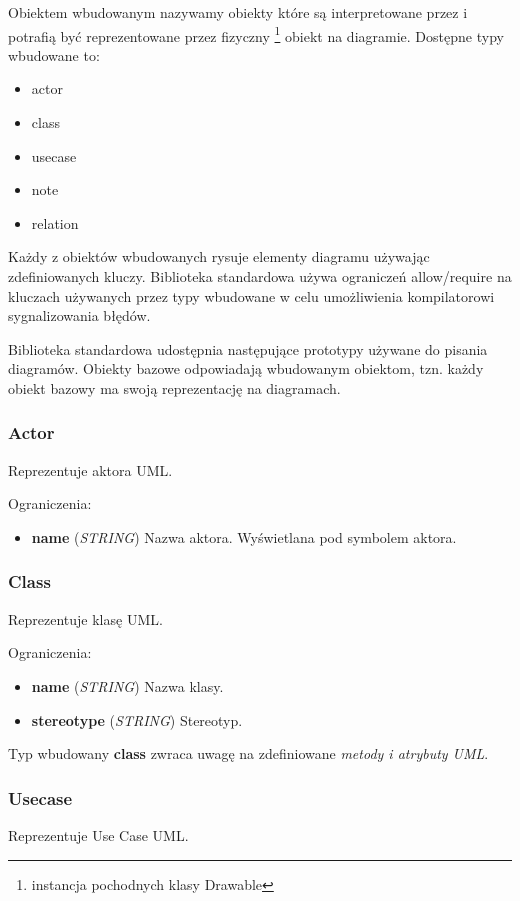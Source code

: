 Obiektem wbudowanym nazywamy obiekty które są interpretowane przez \omlet i potrafią być reprezentowane przez fizyczny \footnote{instancja pochodnych klasy Drawable} obiekt na diagramie. Dostępne typy wbudowane to:

\begin{itemize}
	\item actor
	\item class
	\item usecase
	\item note
	\item relation
\end{itemize}

Każdy z obiektów wbudowanych rysuje elementy diagramu używając zdefiniowanych kluczy. Biblioteka standardowa używa ograniczeń allow/require na kluczach używanych przez typy wbudowane w celu umożliwienia kompilatorowi sygnalizowania błędów.

Biblioteka standardowa udostępnia następujące prototypy używane do pisania diagramów. Obiekty bazowe odpowiadają wbudowanym obiektom, tzn. każdy obiekt bazowy ma swoją reprezentację na diagramach.

\subsubsection{Actor}
Reprezentuje aktora UML.

Ograniczenia:
\begin{itemize}
	\item \textbf{name} (\emph{STRING}) Nazwa aktora. Wyświetlana pod symbolem aktora.
\end{itemize}
	
\subsubsection{Class}
Reprezentuje klasę UML.

Ograniczenia:
\begin{itemize}
	\item \textbf{name} (\emph{STRING}) Nazwa klasy.
	\item \textbf{stereotype} (\emph{STRING}) Stereotyp.
\end{itemize}

Typ wbudowany \textbf{class} zwraca uwagę na zdefiniowane \emph{metody i atrybuty UML}.

\subsubsection{Usecase}
Reprezentuje Use Case UML.

